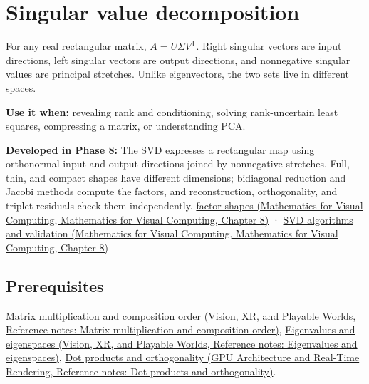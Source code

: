 \hypertarget{appendix-1fad5e7f36fa}{}\label{referencestart:appendix-1fad5e7f36fa}
\section{Singular value decomposition}\label{appendix-1fad5e7f36fa-singular-value-decomposition}

For any real rectangular matrix, \(A=U\Sigma V^\mathsf T\). Right singular vectors are input directions, left singular vectors are output directions, and nonnegative singular values are principal stretches. Unlike eigenvectors, the two sets live in different spaces.

\textbf{Use it when:} revealing rank and conditioning, solving rank-uncertain least squares, compressing a matrix, or understanding PCA.

\textbf{Developed in Phase 8:} The SVD expresses a rectangular map using orthonormal input and output directions joined by nonnegative stretches. Full, thin, and compact shapes have different dimensions; bidiagonal reduction and Jacobi methods compute the factors, and reconstruction, orthogonality, and triplet residuals check them independently. \href{../02-Mathematics-for-Visual-Computing/main.pdf\#nameddest=02-foundations-ii-ch024-full-thin-and-compact-shapes-for-tall-and-wide-matrices}{factor shapes (Mathematics for Visual Computing, Mathematics for Visual Computing, Chapter 8)} · \href{../02-Mathematics-for-Visual-Computing/main.pdf\#nameddest=02-foundations-ii-ch024-how-numerical-software-computes-and-checks-an-svd}{SVD algorithms and validation (Mathematics for Visual Computing, Mathematics for Visual Computing, Chapter 8)}

\subsection{Prerequisites}\label{appendix-1fad5e7f36fa-prerequisites}

\href{../07-Vision-XR-and-Playable-Worlds/main.pdf\#nameddest=appendix-ab31ef447dbf}{Matrix multiplication and composition order (Vision, XR, and Playable Worlds, Reference notes: Matrix multiplication and composition order)}, \href{../07-Vision-XR-and-Playable-Worlds/main.pdf\#nameddest=appendix-0b3be18411f9}{Eigenvalues and eigenspaces (Vision, XR, and Playable Worlds, Reference notes: Eigenvalues and eigenspaces)}, \href{../06-GPU-Architecture-and-Real-Time-Rendering/main.pdf\#nameddest=appendix-8bc4e8fc547c}{Dot products and orthogonality (GPU Architecture and Real-Time Rendering, Reference notes: Dot products and orthogonality)}.

